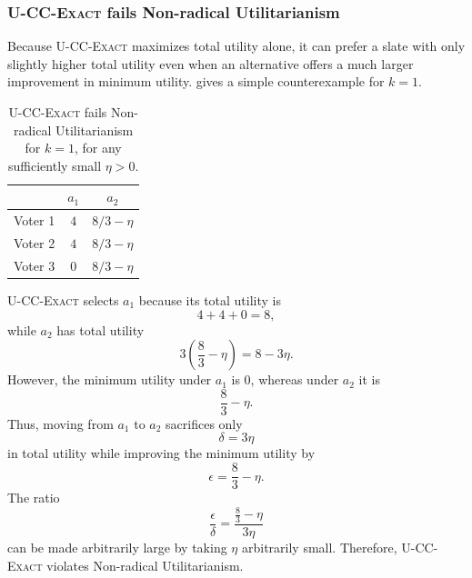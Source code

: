\documentclass[letterpaper]{article} %
\newcommand{\Exact}{\textsc{U-CC-Exact}}
\begin{document}
\subsubsection{\Exact{} fails Non-radical Utilitarianism}
\label{app:exact-nru}

Because \Exact{} maximizes total utility alone, it can prefer a slate with only slightly higher total utility even when an alternative offers a much larger improvement in minimum utility.
 gives a simple counterexample for \(k=1\).

\begin{table}[t]
\centering
\begin{tabular}{l|cc}
\hline
 & $a_1$ & $a_2$ \\
\hline
Voter 1 & $4$ & $8/3-\eta$ \\
Voter 2 & $4$ & $8/3-\eta$ \\
Voter 3 & $0$ & $8/3-\eta$ \\
\hline
\end{tabular}
\caption{\Exact{} fails Non-radical Utilitarianism for \(k=1\), for any sufficiently small \(\eta>0\).}
\label{tab:failure-exact-nru}
\end{table}

\Exact{} selects \(a_1\) because its total utility is
\[
4+4+0=8,
\]
while \(a_2\) has total utility
\[
3\left(\frac{8}{3}-\eta\right)=8-3\eta.
\]
However, the minimum utility under \(a_1\) is \(0\), whereas under \(a_2\) it is
\[
\frac{8}{3}-\eta.
\]
Thus, moving from \(a_1\) to \(a_2\) sacrifices only
\[
\delta=3\eta
\]
in total utility while improving the minimum utility by
\[
\epsilon=\frac{8}{3}-\eta.
\]
The ratio
\[
\frac{\epsilon}{\delta}
=
\frac{\frac{8}{3}-\eta}{3\eta}
\]
can be made arbitrarily large by taking \(\eta\) arbitrarily small.
Therefore, \Exact{} violates Non-radical Utilitarianism.
\end{document}
